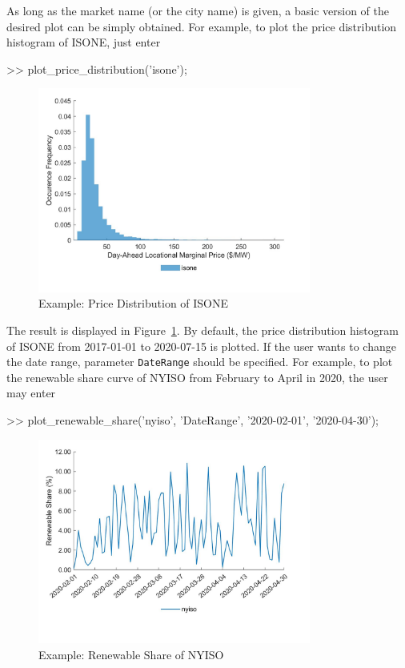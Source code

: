\documentclass[11pt]{article}
\numberwithin{equation}{section}
\numberwithin{table}{section}
\numberwithin{figure}{section}
\begin{document}
As long as the market name (or the city name) is given, a basic version of the desired plot can be simply obtained. For example, to plot the price distribution histogram of ISONE, just enter

\begin{Code}
  >> plot_price_distribution('isone');
\end{Code}

\begin{figure}
  \centering
  \noindent\includegraphics[width=0.8\textwidth]{figures/visualization_example1.jpg}
  \caption{Example: Price Distribution of ISONE} \label{fig:vis_eg1}
\end{figure}

The result is displayed in Figure~\ref{fig:vis_eg1}. By default, the price distribution histogram of ISONE from 2017-01-01 to 2020-07-15 is plotted. If the user wants to change the date range, parameter \verb!DateRange! should be specified. For example, to plot the renewable share curve of NYISO from February to April in 2020, the user may enter

\begin{Code}
  >> plot_renewable_share('nyiso', 'DateRange', {'2020-02-01',
      '2020-04-30'});
\end{Code}

\begin{figure}
  \centering
  \noindent\includegraphics[width=0.8\textwidth]{figures/visualization_example2.jpg}
  \caption{Example: Renewable Share of NYISO} \label{fig:vis_eg2}
\end{figure}
\end{document}
